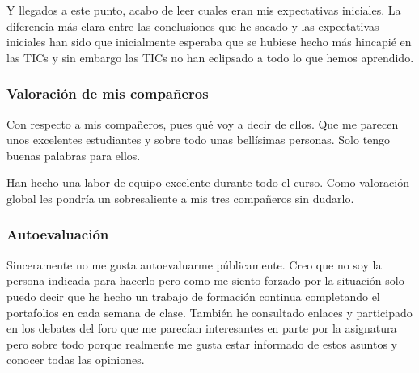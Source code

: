 \begin{leftbar}{\guscolor}
Y llegados a este punto, acabo de leer cuales eran mis expectativas iniciales. La diferencia más clara entre las conclusiones que he sacado y las expectativas iniciales han sido que inicialmente esperaba que se hubiese hecho más hincapié en las TICs y sin embargo las TICs no han eclipsado a todo lo que hemos aprendido.

\subsubsection{Valoración de mis compañeros}
Con respecto a mis compañeros, pues qué voy a decir de ellos. Que me parecen unos excelentes estudiantes y sobre todo unas bellísimas personas. Solo tengo buenas palabras para ellos.

Han hecho una labor de equipo excelente durante todo el curso. Como valoración global les pondría un sobresaliente a mis tres compañeros sin dudarlo.

\subsubsection{Autoevaluación}
Sinceramente no me gusta autoevaluarme públicamente. Creo que no soy la persona indicada para hacerlo pero como me siento forzado por la situación solo puedo decir que he hecho un trabajo de formación continua completando el portafolios en cada semana de clase. También he consultado enlaces y participado en los debates del foro que me parecían interesantes en parte por la asignatura pero sobre todo porque realmente me gusta estar informado de estos asuntos y conocer todas las opiniones.

\end{leftbar}

